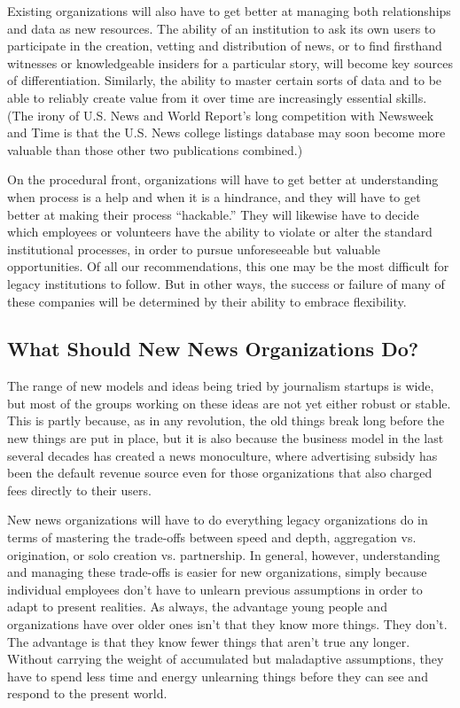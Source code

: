 Existing organizations will also have to get better at managing both relationships
and data as new resources. The ability of an institution to ask its own users
to participate in the creation, vetting and distribution of news, or to find firsthand
witnesses or knowledgeable insiders for a particular story, will become key
sources of differentiation. Similarly, the ability to master certain sorts of data and
to be able to reliably create value from it over time are increasingly essential skills.
(The irony of U.S. News and World Report’s long competition with Newsweek
and Time is that the U.S. News college listings database may soon become more
valuable than those other two publications combined.)

On the procedural front, organizations will have to get better at understanding
when process is a help and when it is a hindrance, and they will have to
get better at making their process ``hackable.'' They will likewise have to decide which employees or volunteers have the ability to violate or alter the standard
institutional processes, in order to pursue unforeseeable but valuable opportunities.
Of all our recommendations, this one may be the most difficult for legacy
institutions to follow. But in other ways, the success or failure of many of these
companies will be determined by their ability to embrace flexibility.

\subsection{What Should New News Organizations Do?}
The range of new models and ideas being tried by journalism startups is wide,
but most of the groups working on these ideas are not yet either robust or stable.
This is partly because, as in any revolution, the old things break long before the
new things are put in place, but it is also because the business model in the last
several decades has created a news monoculture, where advertising subsidy has
been the default revenue source even for those organizations that also charged
fees directly to their users.

New news organizations will have to do everything legacy organizations do in
terms of mastering the trade-offs between speed and depth, aggregation vs. origination,
or solo creation vs. partnership. In general, however, understanding and
managing these trade-offs is easier for new organizations, simply because individual
employees don’t have to unlearn previous assumptions in order to adapt
to present realities. As always, the advantage young people and organizations have
over older ones isn’t that they know more things. They don’t. The advantage is that
they know fewer things that aren’t true any longer. Without carrying the weight
of accumulated but maladaptive assumptions, they have to spend less time and
energy unlearning things before they can see and respond to the present world.


